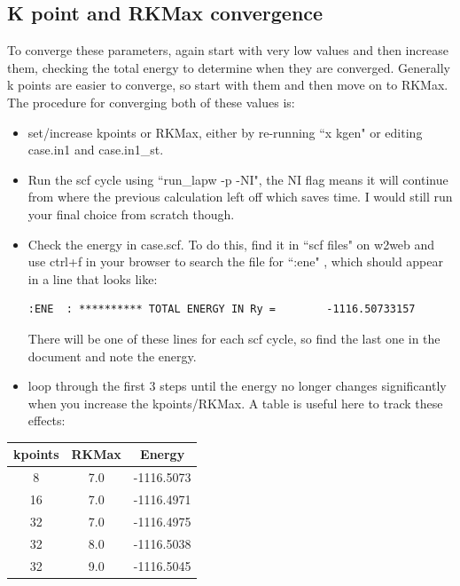 \documentclass[12pt]{article}
\begin{document}
\subsection{K point and RKMax convergence}

To converge these parameters, again start with very low values and then increase them, checking the total energy to determine when they are converged.  Generally k points are easier to converge, so start with them and then move on to RKMax. The procedure for converging both of these values is:

\begin{itemize}
	\item set/increase kpoints or RKMax, either by re-running ``x kgen" or editing case.in1 and case.in1\_st.
	
	\item Run the scf cycle using ``run\_lapw -p -NI", the NI flag means it will continue from where the previous calculation left off which saves time. I would still run your final choice from scratch though.
	
	\item Check the energy in case.scf.  To do this, find it in ``scf files" on w2web and use ctrl+f in your browser to search the file for ``:ene" , which should appear in a line that looks like: 
	
		\begin{lstlisting}
:ENE  : ********** TOTAL ENERGY IN Ry =        -1116.50733157
		\end{lstlisting}
	
	There will be one of these lines for each scf cycle, so find the last one in the document and note the energy. 
	
	
	\item loop through the first 3 steps until the energy no longer changes significantly when you increase the kpoints/RKMax.  A table is useful here to track these effects:
	
\end{itemize}

\begin{table}[H]
	\centering
\begin{tabular}{ccc}

			kpoints & RKMax & Energy \\
			\hline
			8 & 7.0 &  -1116.5073\\
			16 & 7.0 & -1116.4971\\
			32 & 7.0 & -1116.4975\\
			32 & 8.0 & -1116.5038\\
			32 & 9.0 & -1116.5045\\
			
			

\end{tabular}

\end{table}
\end{document}
